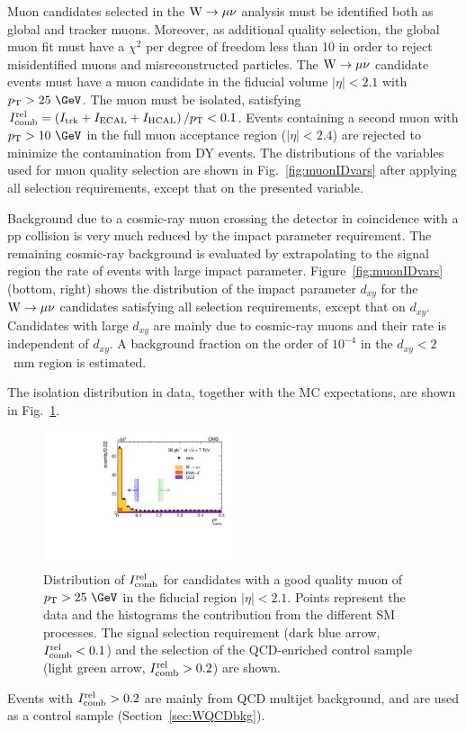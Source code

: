 Muon candidates selected in the $\mathrm{W} \rightarrow \mu\nu$ analysis must be identified both as global and tracker muons.
Moreover, as additional quality selection, the global muon fit must have a $\chi^2$ per degree of freedom less than 10
in order to reject misidentified muons and misreconstructed particles.
The $\mathrm{W} \rightarrow \mu\nu$ candidate events must have a muon candidate in the fiducial volume $|\eta|<2.1$ with 
$\Pt>25~\GeV$. 
The muon must be isolated, satisfying 
$I^{\textrm{rel}}_{\textrm{comb}} = \left( I_{\textrm{trk}} +I_{\textrm{ECAL}}+I_{\textrm{HCAL}}\right)/p_{\mathrm{T}} < 0.1$.
Events containing a second muon with $\Pt > 10~\GeV$ in the full muon acceptance region
($|\eta|<2.4$) are rejected to minimize the contamination from DY events.
The distributions of the variables used for muon quality selection are shown 
in Fig.~\ref{fig:muonIDvars} after applying all selection requirements, except that on
the presented  variable.

Background due to a cosmic-ray muon crossing the detector in coincidence with a pp collision is very
much reduced by the impact parameter requirement.
The remaining cosmic-ray background is evaluated by extrapolating to the signal region the rate of events with
large impact parameter.
Figure~\ref{fig:muonIDvars} (bottom, right) shows the distribution of the
impact parameter $d_{xy}$ for the $\mathrm{W} \rightarrow \mu\nu$ candidates satisfying all selection requirements, except
that on $d_{xy}$.
Candidates with large $d_{xy}$ are mainly due to cosmic-ray muons and their rate is independent of $d_{xy}$.
A background fraction on the order of $10^{-4}$ in the $d_{xy}<2$~mm region is estimated.

The isolation distribution in data, together with the MC expectations, are shown in
Fig.~\ref{figure:Wmunu_iso}. 
\begin{figure}[htbp] {\centering
    \includegraphics[width=0.5\textwidth]{figs/Wmunu_isolation.pdf}
    \caption{Distribution of $I^{\textrm{rel}}_{\textrm{comb}}$ for candidates with a good quality muon 
      of $\Pt>25~\GeV$ in the fiducial region $|\eta|<2.1$.
      Points represent the data and the histograms the contribution from the 
      different SM processes.
      The signal selection requirement (dark blue arrow, $I^{\textrm{rel}}_{\textrm{comb}}<0.1$) and the selection of the QCD-enriched
      control sample (light green arrow, $I^{\textrm{rel}}_{\textrm{comb}}>0.2$) are shown.}
    \label{figure:Wmunu_iso}}
\end{figure}
Events with $I^{\textrm{rel}}_{\textrm{comb}} > 0.2$ are mainly from QCD multijet background, and are used as
a control sample (Section~\ref{sec:WQCDbkg}).


